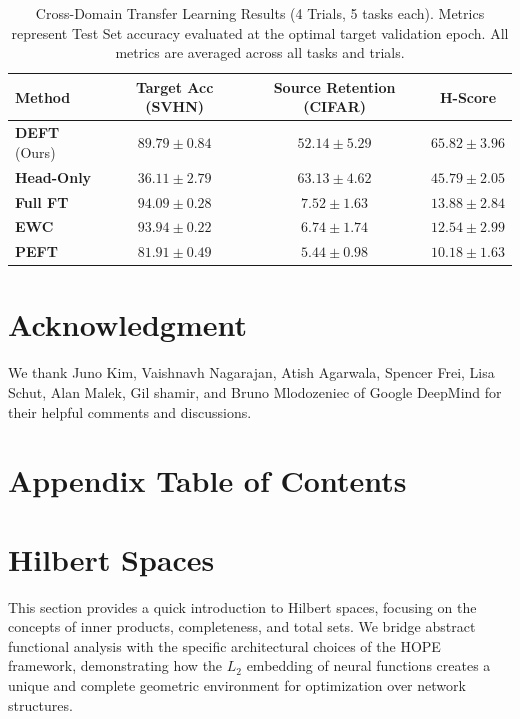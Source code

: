 \documentclass[11pt, a4paper, copyright, gdm]{google}
\theoremstyle{definition}
\begin{document}
\begin{table}[ht]
\centering
\caption{Cross-Domain Transfer Learning Results (4 Trials, 5 tasks each). Metrics represent Test Set accuracy evaluated at the optimal target validation epoch. All metrics are averaged across all tasks and trials.}
\vspace{0.2cm}
\begin{tabular}{@{}lccc@{}}
\toprule
\textbf{Method} & \textbf{Target Acc (SVHN)} & \textbf{Source Retention (CIFAR)} & \textbf{H-Score} \\
\midrule
\textbf{DEFT} (Ours) & $89.79 \pm 0.84$ & $52.14 \pm 5.29$ & $\mathbf{65.82 \pm 3.96}$ \\
\textbf{Head-Only} & $36.11 \pm 2.79$ & $63.13 \pm 4.62$ & $45.79 \pm 2.05$ \\
\textbf{Full FT} & $94.09 \pm 0.28$ & $7.52 \pm 1.63$ & $13.88 \pm 2.84$ \\
\textbf{EWC} & $93.94 \pm 0.22$ & $6.74 \pm 1.74$ & $12.54 \pm 2.99$ \\
\textbf{PEFT} & $81.91 \pm 0.49$ & $5.44 \pm 0.98$ & $10.18 \pm 1.63$ \\
\bottomrule
\end{tabular}
\label{tab:results}
\end{table}



\section{Acknowledgment}
We thank Juno Kim, Vaishnavh Nagarajan, Atish Agarwala, Spencer Frei, Lisa Schut, Alan Malek, Gil shamir, and Bruno Mlodozeniec of Google DeepMind for their helpful comments and discussions.


\newpage




\clearpage
\appendix

\section*{Appendix Table of Contents}
\startcontents[appendices]
\newpage



\section{Hilbert Spaces}
\label{sec:hilbert}
This section provides a quick introduction to Hilbert spaces, focusing on the concepts of inner products, completeness, and total sets. We bridge abstract functional analysis with the specific architectural choices of the HOPE framework, demonstrating how the $L_2$ embedding of neural functions creates a unique and complete geometric environment for optimization over network structures.
\end{document}
